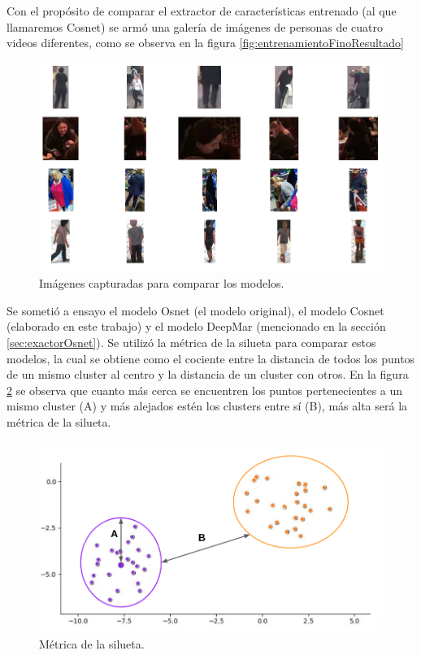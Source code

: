 Con el propósito de comparar el extractor de características entrenado (al que llamaremos Cosnet) se armó una galería de imágenes de personas de cuatro videos diferentes, como se observa en la figura \ref{fig:entrenamientoFinoResultado}

\begin{figure}[ht]
	\centering
	\includegraphics[scale=.5]{./Figures/galerias.png}
	\caption{Imágenes capturadas para comparar los modelos.}
	\label{fig:galerias}
\end{figure}

Se sometió a ensayo el modelo Osnet (el modelo original), el modelo Cosnet (elaborado en este trabajo) y el modelo DeepMar (mencionado en la sección \ref{sec:exactorOsnet}). Se utilizó la métrica de la silueta \citep{METRICA_SILUETA} para comparar estos modelos, la cual se obtiene como el cociente entre la distancia de todos los puntos de un mismo cluster al centro y la distancia de un cluster con otros. En la figura \ref{fig:metricaSilueta} se observa que cuanto más cerca se encuentren los puntos pertenecientes a un mismo cluster (A) y más alejados estén los clusters entre sí (B), más alta será la métrica de la silueta.

\begin{figure}[ht]
	\centering
	\includegraphics[scale=.5]{./Figures/metricaSilueta.png}
	\caption{Métrica de la silueta.}
	\label{fig:metricaSilueta}
\end{figure}

